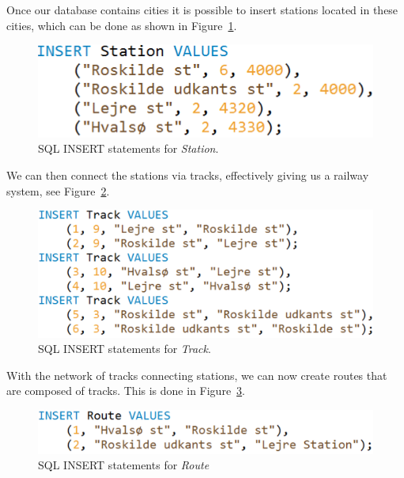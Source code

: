 Once our database contains cities it is possible to insert stations located in 
these cities, which can be done as shown in Figure~\ref{fig:ins:station}.

\begin{figure}[ht!]
    \centering
    \includegraphics[scale=.5]{img/INSERT_Statement_Station}
    \caption{SQL INSERT statements for \emph{Station}.}
    \label{fig:ins:station}
\end{figure}

We can then connect the stations via tracks, effectively giving us a railway 
system, see Figure~\ref{fig:ins:track}.

\begin{figure}[ht!]
    \centering
    \includegraphics[scale=.5]{img/INSERT_Statements_Track}
    \caption{SQL INSERT statements for \emph{Track}.}
    \label{fig:ins:track}
\end{figure}

With the network of tracks connecting stations, we can now create routes that 
are composed of tracks. This is done in Figure~\ref{fig:ins:route}.

\begin{figure}[ht!]
    \centering
    \includegraphics[scale=.5]{img/INSERT_Statements_Route}
    \caption{SQL INSERT statements for \emph{Route}}
    \label{fig:ins:route}
\end{figure}

